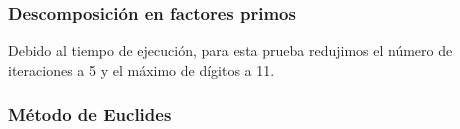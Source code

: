 \subsubsection{Descomposición en factores primos}
Debido al tiempo de ejecución, para esta prueba redujimos el número de iteraciones a 5 y el máximo de dígitos a 11.
\begin{figure}[H]
\end{figure}


\subsubsection{Método de Euclides}
\begin{figure}[H]
\end{figure}